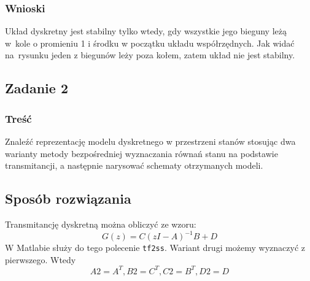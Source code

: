 \documentclass{article}
\begin{document}
\subsubsection{Wnioski}
Układ dyskretny jest stabilny tylko wtedy, gdy wszystkie jego bieguny leżą w~kole o promieniu 1 i środku w początku układu współrzędnych. Jak widać na~rysunku jeden z biegunów leży poza kołem, zatem układ nie jest stabilny.
\subsection{Zadanie 2}
\subsubsection{Treść}
Znaleźć reprezentację modelu dyskretnego w przestrzeni stanów stosując dwa warianty
metody bezpośredniej wyznaczania równań stanu na podstawie transmitancji, a następnie
narysować schematy otrzymanych modeli.
\subsection{Sposób rozwiązania}
Transmitancję dyskretną można obliczyć ze wzoru:
$$
G(z)=C(zI-A)^{-1}B+D
$$
W Matlabie służy do tego polecenie \verb+tf2ss+.
Wariant drugi możemy wyznaczyć z pierwszego.
Wtedy
$$
A2=A^T, B2=C^T, C2=B^T, D2=D
$$
\end{document}
